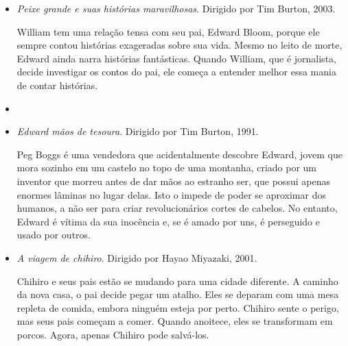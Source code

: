\documentclass[11pt]{extarticle}
\begin{document}
\begin{itemize}
\item \textit{Peixe grande e suas histórias maravilhosas}. Dirigido por Tim Burton, 2003.

William tem uma relação tensa com seu pai, Edward Bloom, porque ele sempre contou histórias exageradas sobre sua vida. Mesmo no leito de morte, Edward ainda narra histórias fantásticas. Quando William, que é jornalista, decide investigar os contos do pai, ele começa a entender melhor essa mania de contar histórias.

\item \item \textit{Edward mãos de tesoura}. Dirigido por Tim Burton, 1991.

Peg Boggs é uma vendedora que acidentalmente descobre Edward, jovem que mora sozinho em um castelo no topo de uma montanha, criado por um inventor que morreu antes de dar mãos ao estranho ser, que possui apenas enormes lâminas no lugar delas. Isto o impede de poder se aproximar dos humanos, a não ser para criar revolucionários cortes de cabelos. No entanto, Edward é vítima da sua inocência e, se é amado por uns, é perseguido e usado por outros.

\item \textit{A viagem de chihiro}. Dirigido por Hayao Miyazaki, 2001.

Chihiro e seus pais estão se mudando para uma cidade diferente. A caminho da nova casa, o pai decide pegar um atalho. Eles se deparam com uma mesa repleta de comida, embora ninguém esteja por perto. Chihiro sente o perigo, mas seus pais começam a comer. Quando anoitece, eles se transformam em porcos. Agora, apenas Chihiro pode salvá-los.

\end{itemize}
\end{document}

